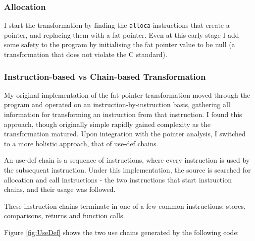 \subsubsection{Allocation}

I start the transformation by finding the \verb!alloca! instructions that create a pointer, and replacing them with a fat pointer.
Even at this early stage I add some safety to the program by initialising the fat pointer value to be null (a transformation that does not violate the C standard).

\subsubsection{Instruction-based vs Chain-based Transformation}

My original implementation of the fat-pointer transformation moved through the program and operated on an instruction-by-instruction basis, gathering all information for transforming an instruction from that instruction.
I found this approach, though originally simple rapidly gained complexity as the transformation matured.
Upon integration with the pointer analysis, I switched to a  more holistic approach, that of use-def chains.

An use-def chain is a sequence of instructions, where every instruction is used by the subsequent instruction.
Under this implementation, the source is searched for allocation and call instructions - the two instructions that start instruction chains, and their usage was followed.

These instruction chains terminate in one of a few common instructions: stores, comparisons, returns and function calls. 

Figure \ref{fig:UseDef} shows the two use chains generated by the following code:

